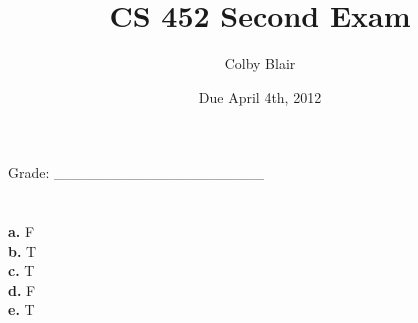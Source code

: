 \documentclass[11pt,letterpaper]{article}
\date{Due April 4th, 2012}
\title{CS 452 Second Exam}
\author{Colby Blair}
\begin{document}
\maketitle

\begin{center}

Grade: \_\_\_\_\_\_\_\_\_\_\_\_\_\_\_\_\_\_\_\_
\end{center}

\thispagestyle{empty}

\pagebreak


\section{}

\textbf{a.} F \\
\textbf{b.} T \\
\textbf{c.} T \\
\textbf{d.} F \\
\textbf{e.} T \\
\end{document}
